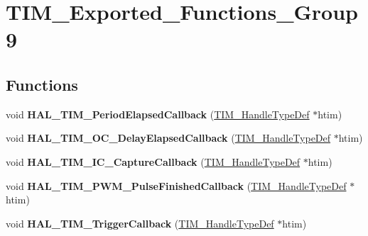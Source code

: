 \hypertarget{group___t_i_m___exported___functions___group9}{}\section{T\+I\+M\+\_\+\+Exported\+\_\+\+Functions\+\_\+\+Group9}
\label{group___t_i_m___exported___functions___group9}
\subsection*{Functions}
\begin{DoxyCompactItemize}
\item 
void {\bfseries H\+A\+L\+\_\+\+T\+I\+M\+\_\+\+Period\+Elapsed\+Callback} (\hyperlink{struct_t_i_m___handle_type_def}{T\+I\+M\+\_\+\+Handle\+Type\+Def} $\ast$htim)\hypertarget{group___t_i_m___exported___functions___group9_ga8a3b0ad512a6e6c6157440b68d395eac}{}\label{group___t_i_m___exported___functions___group9_ga8a3b0ad512a6e6c6157440b68d395eac}

\item 
void {\bfseries H\+A\+L\+\_\+\+T\+I\+M\+\_\+\+O\+C\+\_\+\+Delay\+Elapsed\+Callback} (\hyperlink{struct_t_i_m___handle_type_def}{T\+I\+M\+\_\+\+Handle\+Type\+Def} $\ast$htim)\hypertarget{group___t_i_m___exported___functions___group9_ga1fc39499fe9db8b7fb88005e9f107a36}{}\label{group___t_i_m___exported___functions___group9_ga1fc39499fe9db8b7fb88005e9f107a36}

\item 
void {\bfseries H\+A\+L\+\_\+\+T\+I\+M\+\_\+\+I\+C\+\_\+\+Capture\+Callback} (\hyperlink{struct_t_i_m___handle_type_def}{T\+I\+M\+\_\+\+Handle\+Type\+Def} $\ast$htim)\hypertarget{group___t_i_m___exported___functions___group9_ga77a2401a35ddd9bd0b8fc28331b81381}{}\label{group___t_i_m___exported___functions___group9_ga77a2401a35ddd9bd0b8fc28331b81381}

\item 
void {\bfseries H\+A\+L\+\_\+\+T\+I\+M\+\_\+\+P\+W\+M\+\_\+\+Pulse\+Finished\+Callback} (\hyperlink{struct_t_i_m___handle_type_def}{T\+I\+M\+\_\+\+Handle\+Type\+Def} $\ast$htim)\hypertarget{group___t_i_m___exported___functions___group9_ga07e5fc4d223b16bec2fd6bed547cf91d}{}\label{group___t_i_m___exported___functions___group9_ga07e5fc4d223b16bec2fd6bed547cf91d}

\item 
void {\bfseries H\+A\+L\+\_\+\+T\+I\+M\+\_\+\+Trigger\+Callback} (\hyperlink{struct_t_i_m___handle_type_def}{T\+I\+M\+\_\+\+Handle\+Type\+Def} $\ast$htim)\hypertarget{group___t_i_m___exported___functions___group9_ga189577c72b1963671b26820d8161d678}{}\label{group___t_i_m___exported___functions___group9_ga189577c72b1963671b26820d8161d678}


\end{DoxyCompactItemize}
